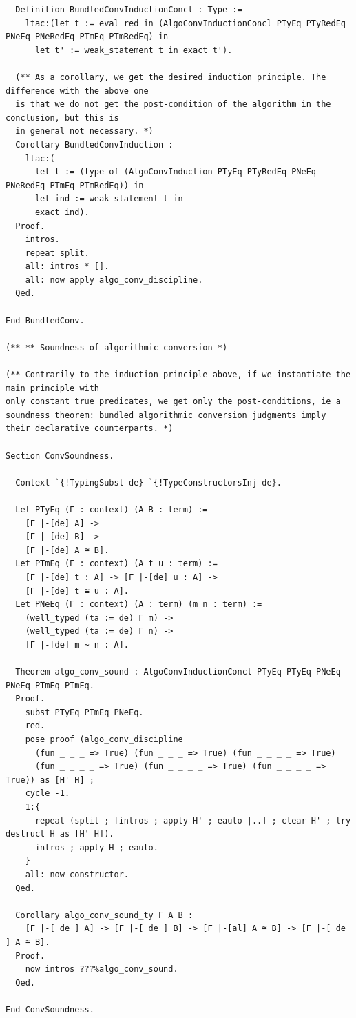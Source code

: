 \begin{lstlisting}
  Definition BundledConvInductionConcl : Type :=
    ltac:(let t := eval red in (AlgoConvInductionConcl PTyEq PTyRedEq PNeEq PNeRedEq PTmEq PTmRedEq) in
      let t' := weak_statement t in exact t').

  (** As a corollary, we get the desired induction principle. The difference with the above one
  is that we do not get the post-condition of the algorithm in the conclusion, but this is
  in general not necessary. *)
  Corollary BundledConvInduction :
    ltac:(
      let t := (type of (AlgoConvInduction PTyEq PTyRedEq PNeEq PNeRedEq PTmEq PTmRedEq)) in
      let ind := weak_statement t in
      exact ind).
  Proof.
    intros.
    repeat split.
    all: intros * [].
    all: now apply algo_conv_discipline.
  Qed.

End BundledConv.

(** ** Soundness of algorithmic conversion *)

(** Contrarily to the induction principle above, if we instantiate the main principle with
only constant true predicates, we get only the post-conditions, ie a soundness theorem: bundled algorithmic conversion judgments imply their declarative counterparts. *)

Section ConvSoundness.

  Context `{!TypingSubst de} `{!TypeConstructorsInj de}.

  Let PTyEq (Γ : context) (A B : term) :=
    [Γ |-[de] A] ->
    [Γ |-[de] B] ->
    [Γ |-[de] A ≅ B].
  Let PTmEq (Γ : context) (A t u : term) :=
    [Γ |-[de] t : A] -> [Γ |-[de] u : A] ->
    [Γ |-[de] t ≅ u : A].
  Let PNeEq (Γ : context) (A : term) (m n : term) :=
    (well_typed (ta := de) Γ m) ->
    (well_typed (ta := de) Γ n) ->
    [Γ |-[de] m ~ n : A].

  Theorem algo_conv_sound : AlgoConvInductionConcl PTyEq PTyEq PNeEq PNeEq PTmEq PTmEq.
  Proof.
    subst PTyEq PTmEq PNeEq.
    red.
    pose proof (algo_conv_discipline 
      (fun _ _ _ => True) (fun _ _ _ => True) (fun _ _ _ _ => True)
      (fun _ _ _ _ => True) (fun _ _ _ _ => True) (fun _ _ _ _ => True)) as [H' H] ;
    cycle -1.
    1:{
      repeat (split ; [intros ; apply H' ; eauto |..] ; clear H' ; try destruct H as [H' H]).
      intros ; apply H ; eauto. 
    }
    all: now constructor.
  Qed.

  Corollary algo_conv_sound_ty Γ A B :
    [Γ |-[ de ] A] -> [Γ |-[ de ] B] -> [Γ |-[al] A ≅ B] -> [Γ |-[ de ] A ≅ B].
  Proof.
    now intros ???%algo_conv_sound.
  Qed.

End ConvSoundness.


\end{lstlisting}
